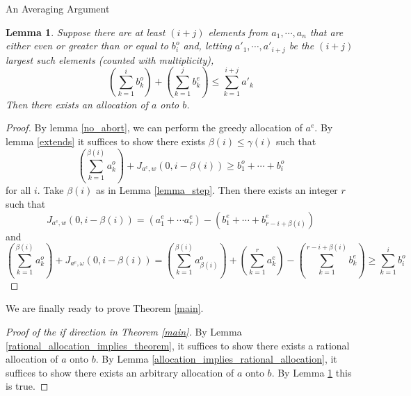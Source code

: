 \documentclass[11pt,a4paper]{article}
\newtheorem{lemma}[subsection]{Lemma}
\begin{document}
\begin{section}{An Averaging Argument}
\begin{lemma} \label{other_condition} Suppose there are at least $(i + j)$ elements from $a_1, \cdots, a_n$ that are either even or greater than or equal to $b^o_i$ and, letting $a'_1, \cdots, a'_{i + j}$ be the $(i + j)$ largest such elements (counted with multiplicity),
\[
\left ( \sum_{k = 1}^i b^o_k \right ) + \left ( \sum_{k = 1}^j b^e_k \right ) \leq \sum_{k = 1}^{i + j} a'_{k}
\]
Then there exists an allocation of $a$ onto $b$.
\end{lemma}
\begin{proof}
By lemma \ref{no_abort}, we can perform the greedy allocation of $a^e$. By lemma \ref{extends} it suffices to show there exists $\beta(i) \leq \gamma(i)$ such that
\[
\left ( \sum_{k = 1}^{\beta(i)} a^o_{k} \right ) + J_{a^e, w} (0, i - \beta(i) ) \geq b^o_1 + \cdots + b^o_i
\]
for all $i$. Take $\beta(i)$ as in Lemma \ref{lemma_step}. Then there exists an integer $r$ such that
\[
J_{a^e, w} (0, i - \beta(i) ) = (a^e_1 + \cdots a^e_r) - (b^e_1 + \cdots + b^e_{r - i + \beta(i)})
\]
and
\[
\left ( \sum_{k = 1}^{\beta(i)} a^o_{k} \right ) + J_{a^e, \omega} (0, i - \beta(i) ) = \left ( \sum_{k = 1}^{\beta(i)} a^o_{\beta(i)} \right ) + \left ( \sum_{k = 1}^{r} a^e_k \right ) - \left ( \sum_{k = 1}^{r - i + \beta(i) } b^e_k \right ) \geq \sum_{k = 1}^i b^o_i
\]
\end{proof}

We are finally ready to prove Theorem \ref{main}.

\begin{proof}[Proof of the if direction in Theorem \ref{main}] By Lemma \ref{rational_allocation_implies_theorem}, it suffices to show there exists a rational allocation of $a$ onto $b$. By Lemma \ref{allocation_implies_rational_allocation}, it suffices to show there exists an arbitrary allocation of $a$ onto $b$. By Lemma \ref{other_condition} this is true.
\end{proof}



\end{section}
\end{document}
